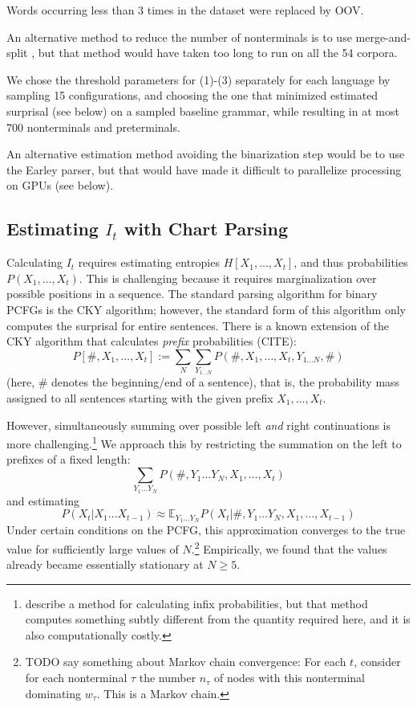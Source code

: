 \documentclass[11pt,letterpaper]{article}
\newcommand{\E}[0]{\mathbb{E}}
\begin{document}
Words occurring less than 3 times in the dataset were replaced by OOV.

An alternative method to reduce the number of nonterminals is to use merge-and-split \citep{DBLP:conf/aaai/PetrovK07}, but that method would have taken too long to run on all the 54 corpora.

We chose the threshold parameters for (1)-(3) separately for each language by sampling 15 configurations, and choosing the one that minimized estimated surprisal (see below) on a sampled baseline grammar, while resulting in at most 700 nonterminals and preterminals.

An alternative estimation method avoiding the binarization step would be to use the Earley parser, but that would have made it difficult to parallelize processing on GPUs (see below).

\subsection{Estimating $I_t$ with Chart Parsing}

Calculating $I_t$ requires estimating entropies $H[X_1, \dots, X_t]$, and thus probabilities $P(X_1, \dots, X_t)$.
This is challenging because it requires marginalization over possible positions in a sequence.
The standard parsing algorithm for binary PCFGs is the CKY algorithm; however, the standard form of this algorithm only computes the surprisal for entire sentences.
There is a known extension of the CKY algorithm that calculates \emph{prefix} probabilities (CITE):
\begin{equation}
P[\#, X_1, \dots, X_t] := \sum_N \sum_{Y_{1\dots N}} P(\#, X_1, \dots, X_t, Y_{1\dots N}, \#)
\end{equation}
(here, $\#$ denotes the beginning/end of a sentence), that is, the probability mass assigned to all sentences starting with the given prefix $X_1, \dots, X_t$.

However, simultaneously summing over possible left \emph{and} right continuations is more challenging.\footnote{\citet{DBLP:conf/emnlp/NederhofS11} describe a method for calculating infix probabilities, but that method computes something subtly different from the quantity required here, and it is also computationally costly.}
We approach this by restricting the summation on the left to prefixes of a fixed length:
\begin{equation}
    \sum_{Y_1\dots Y_N} P(\#, Y_1 \dots Y_N, X_1, \dots, X_t)
\end{equation}
and estimating
\begin{equation}
    P(X_t|X_1\dots X_{t-1}) \approx \E_{Y_1\dots Y_N} P(X_t|\#, Y_1 \dots Y_N, X_1, \dots, X_{t-1})
\end{equation}
Under certain conditions on the PCFG, this approximation converges to the true value for sufficiently large values of $N$.\footnote{TODO say something about Markov chain convergence: For each $t$, consider for each nonterminal $\tau$ the number $n_\tau$ of nodes with this nonterminal dominating $w_\tau$. This is a Markov chain.}
Empirically, we found that the values already became essentially stationary at $N\geq 5$.
\end{document}
